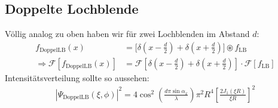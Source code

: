 \documentclass[a4paper]{article}
\newcommand{\ff}[1]{\mathscr{F}\left[#1\right]}
\begin{document}
\subsection{Doppelte Lochblende}
Völlig analog zu oben haben wir für zwei Lochblenden im Abstand $d$:
\begin{align}
f_{\text{DoppelLB}}(x) &= \Bigg[ \delta\left(x-\frac{d}{2}\right) + \delta\left(x+\frac{d}{2}\right) \Bigg]  \circledast f_\text{LB} \\
\Rightarrow \ff{f_{\text{DoppelLB}}(x) } &= \ff{ \delta\left(x-\frac{d}{2}\right) + \delta\left(x+\frac{d}{2}\right)  } \cdot \ff{f_\text{LB}}
\end{align}
Intensitätsverteilung sollte so aussehen:
\begin{align}
|\Psi_\text{DoppelLB} (\xi,\phi)|^2 = 4 \cos^2 \left(\frac{d\pi \sin\alpha_x}{\lambda}\right)\pi^2 R^4 \left[\frac{2J_1(\xi R)}{\xi R}\right]^2
\end{align}
\end{document}
